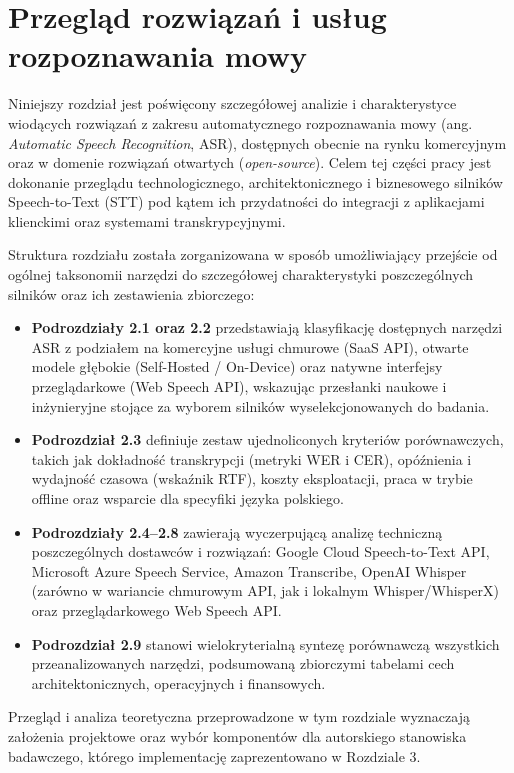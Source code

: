 \section{Przegląd rozwiązań i usług rozpoznawania mowy}
\label{ch:przeglad_narzedzi}
Niniejszy rozdział jest poświęcony szczegółowej analizie i charakterystyce wiodących rozwiązań z zakresu automatycznego rozpoznawania mowy (ang. \textit{Automatic Speech Recognition}, ASR), dostępnych obecnie na rynku komercyjnym oraz w domenie rozwiązań otwartych (\textit{open-source}). Celem tej części pracy jest dokonanie przeglądu technologicznego, architektonicznego i biznesowego silników Speech-to-Text (STT) pod kątem ich przydatności do integracji z aplikacjami klienckimi oraz systemami transkrypcyjnymi.

Struktura rozdziału została zorganizowana w sposób umożliwiający przejście od ogólnej taksonomii narzędzi do szczegółowej charakterystyki poszczególnych silników oraz ich zestawienia zbiorczego:
\begin{itemize}
    \item \textbf{Podrozdziały 2.1 oraz 2.2} przedstawiają klasyfikację dostępnych narzędzi ASR z podziałem na komercyjne usługi chmurowe (SaaS API), otwarte modele głębokie (Self-Hosted / On-Device) oraz natywne interfejsy przeglądarkowe (Web Speech API), wskazując przesłanki naukowe i inżynieryjne stojące za wyborem silników wyselekcjonowanych do badania.
    \item \textbf{Podrozdział 2.3} definiuje zestaw ujednoliconych kryteriów porównawczych, takich jak dokładność transkrypcji (metryki WER i CER), opóźnienia i wydajność czasowa (wskaźnik RTF), koszty eksploatacji, praca w trybie offline oraz wsparcie dla specyfiki języka polskiego.
    \item \textbf{Podrozdziały 2.4--2.8} zawierają wyczerpującą analizę techniczną poszczególnych dostawców i rozwiązań: Google Cloud Speech-to-Text API, Microsoft Azure Speech Service, Amazon Transcribe, OpenAI Whisper (zarówno w wariancie chmurowym API, jak i lokalnym Whisper/WhisperX) oraz przeglądarkowego Web Speech API.
    \item \textbf{Podrozdział 2.9} stanowi wielokryterialną syntezę porównawczą wszystkich przeanalizowanych narzędzi, podsumowaną zbiorczymi tabelami cech architektonicznych, operacyjnych i finansowych.
\end{itemize}

Przegląd i analiza teoretyczna przeprowadzone w tym rozdziale wyznaczają założenia projektowe oraz wybór komponentów dla autorskiego stanowiska badawczego, którego implementację zaprezentowano w Rozdziale 3.
